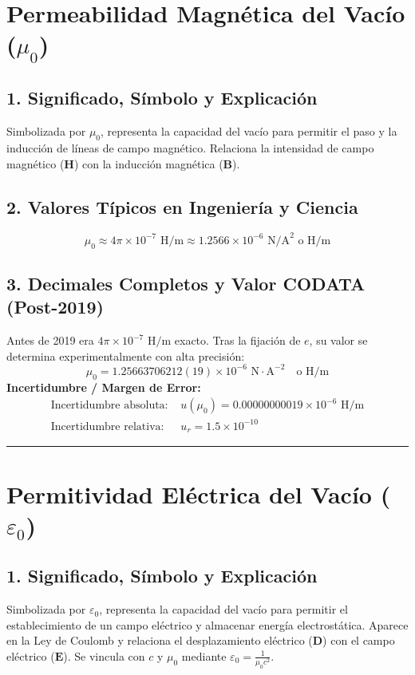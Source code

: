 \documentclass[12pt,a4paper]{article}
\begin{document}
\section{Permeabilidad Magnética del Vacío ($\mu_0$)}

\subsection*{1. Significado, Símbolo y Explicación}
Simbolizada por $\mu_0$, representa la capacidad del vacío para permitir el paso y la inducción de líneas de campo magnético. Relaciona la intensidad de campo magnético ($\mathbf{H}$) con la inducción magnética ($\mathbf{B}$).

\subsection*{2. Valores Típicos en Ingeniería y Ciencia}
\begin{equation*}
\mu_0 \approx 4\pi \times 10^{-7} \text{ H/m} \approx 1.2566 \times 10^{-6} \text{ N/A}^2 \text{ o H/m}
\end{equation*}

\subsection*{3. Decimales Completos y Valor CODATA (Post-2019)}
Antes de 2019 era $4\pi \times 10^{-7} \text{ H/m}$ exacto. Tras la fijación de $e$, su valor se determina experimentalmente con alta precisión:
\begin{equation*}
\mu_0 = 1.25663706212(19) \times 10^{-6} \text{ N}\cdot\text{A}^{-2} \quad \text{o H/m}
\end{equation*}
\textbf{Incertidumbre / Margen de Error:}
\begin{align*}
\text{Incertidumbre absoluta: } & u(\mu_0) = 0.00000000019 \times 10^{-6} \text{ H/m} \\
\text{Incertidumbre relativa: } & u_r = 1.5 \times 10^{-10}
\end{align*}

\vspace{0.8cm}
\hrule
\vspace{0.8cm}

\section{Permitividad Eléctrica del Vacío ($\varepsilon_0$)}

\subsection*{1. Significado, Símbolo y Explicación}
Simbolizada por $\varepsilon_0$, representa la capacidad del vacío para permitir el establecimiento de un campo eléctrico y almacenar energía electrostática. Aparece en la Ley de Coulomb y relaciona el desplazamiento eléctrico ($\mathbf{D}$) con el campo eléctrico ($\mathbf{E}$). Se vincula con $c$ y $\mu_0$ mediante $\varepsilon_0 = \frac{1}{\mu_0 c^2}$.
\end{document}
